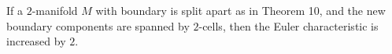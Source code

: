 If a $2$-manifold $M$ with boundary is split apart as in Theorem 10, and the new boundary components are spanned by $2$-cells, then the Euler characteristic is increased by $2$.
